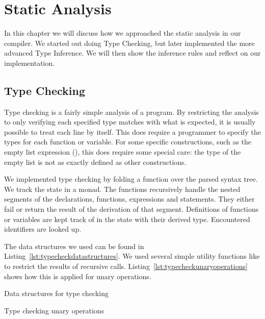 \chapter{Static Analysis}

In this chapter we will discuss how we approached the static analysis in our compiler.
We started out doing Type Checking, but later implemented the more advanced Type Inference.
We will then show the inference rules and reflect on our implementation.


\section{Type Checking}

Type checking is a fairly simple analysis of a program.
By restricting the analysis to only verifying each specified type matches with what is expected, it is usually possible to treat each line by itself.
This does require a programmer to specify the types for each function or variable.
For some specific constructions, such as the empty list expression (\spl{[]}), this does require some special care: the type of the empty list is not as exactly defined as other constructions.

We implemented type checking by folding a function over the parsed syntax tree.
We track the state in a monad.
The functions recursively handle the nested segments of the declarations, functions, expressions and statements.
They either fail or return the result of the derivation of that segment.
Definitions of functions or variables are kept track of in the state with their derived type.
Encountered identifiers are looked up.

The data structures we used can be found in Listing~\ref{lst:typecheckdatastructures}.
We used several simple utility functions like  to restrict the results of recursive  calls.
Listing~\ref{lst:typecheckunaryoperations} shows how this is applied for unary operations.

\begin{listing}[hbtp]
    \centering
    \caption{Data structures for type checking}\label{lst:typecheckdatastructures}
\end{listing}

\begin{listing}[hbtp]
    \centering
    \caption{Type checking unary operations}\label{lst:typecheckunaryoperations}
\end{listing}

